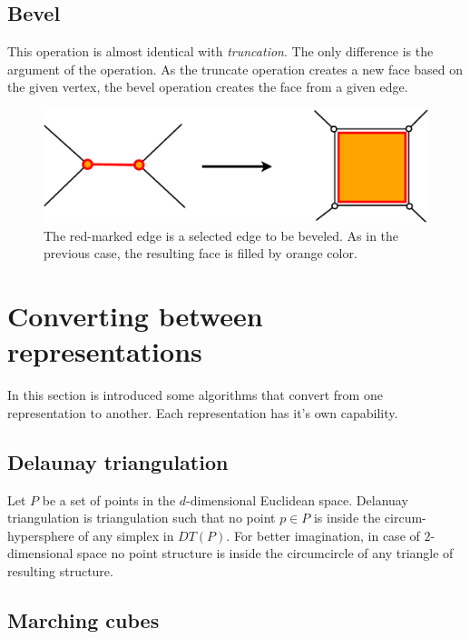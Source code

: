 \subsection{Bevel}

This operation is almost identical with \emph{truncation}. The only difference is the argument of the
operation. As the truncate operation creates a new face based on the given vertex, the bevel operation
creates the face from a given edge.\\

\begin{figure}[ht]
\centering
\includegraphics[scale=0.2]{../img/bevel.eps}
\caption{The red-marked edge is a selected edge to be beveled. As in the previous case, the resulting
face is filled by orange color.}
\end{figure}


\section{Converting between representations}

In this section is introduced some algorithms that convert from one representation to another. Each 
representation has it's own capability.

\subsection{Delaunay triangulation}

Let $P$ be a set of points in the $d$-dimensional Euclidean space.
Delanuay triangulation is triangulation such that no point $p \in P$ is inside the circum-hypersphere
of any simplex in $DT(P)$. For better imagination, in case of $2$-dimensional space no point
structure is inside the circumcircle of any triangle of resulting structure.

\subsection{Marching cubes}
\label{sub:march}

